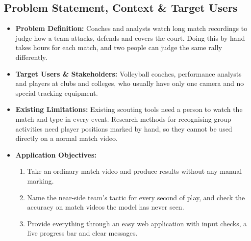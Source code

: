 \documentclass[11pt, a4paper]{article}
\begin{document}
\subsection{Problem Statement, Context \& Target Users}
\begin{itemize}[noitemsep, topsep=2pt]
    \item \textbf{Problem Definition:} Coaches and analysts watch long match recordings to judge how a team attacks, defends and covers the court. Doing this by hand takes hours for each match, and two people can judge the same rally differently.
    \item \textbf{Target Users \& Stakeholders:} Volleyball coaches, performance analysts and players at clubs and colleges, who usually have only one camera and no special tracking equipment.
    \item \textbf{Existing Limitations:} Existing scouting tools need a person to watch the match and type in every event. Research methods for recognising group activities \cite{zhang2024bicausal,ibrahim2016} need player positions marked by hand, so they cannot be used directly on a normal match video.
    \item \textbf{Application Objectives:}
    \begin{enumerate}[noitemsep, topsep=2pt]
        \item Take an ordinary match video and produce results without any manual marking.
        \item Name the near-side team's tactic for every second of play, and check the accuracy on match videos the model has never seen.
        \item Provide everything through an easy web application with input checks, a live progress bar and clear messages.
    \end{enumerate}
\end{itemize}
\end{document}
